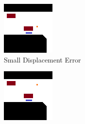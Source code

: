 \begin{figure}[h]
	\begin{subfigure}[t]{0.25\linewidth}
		\includegraphics[width=\linewidth]{Figures/Res_Prop/small_disp_colloquium}
		\caption{Small Displacement Error}
		\label{fig:met_crit_sdisp2}
	\end{subfigure} \hfil
	\begin{subfigure}[t]{0.25\linewidth}
		\includegraphics[width=\linewidth]{Figures/Res_Prop/big_disp_colloquium}

\end{subfigure}
\end{figure}

